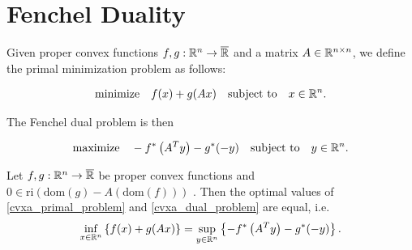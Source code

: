 \section{Fenchel Duality}


Given 
proper convex functions $f, g : \mathbb{R}^n \to \overline{\mathbb{R}}$ 
and
a matrix $A \in \mathbb{R}^{n \times n}$,
we define 
the primal minimization problem as follows:

\begin{gather}
  \label{cvxa_primal_problem}
  \text{minimize}
  \quad
  f(x) + g(Ax) 
  \quad
  \text{subject to}
  \quad
  x \in \mathbb{R}^n.
\end{gather}

The Fenchel dual problem is then

\begin{gather}
  \label{cvxa_dual_problem}
  \text{maximize}
  \quad
  -f^* \left( A^T y \right) - g^*(-y) 
  \quad
  \text{subject to}
  \quad
  y \in \mathbb{R}^n.
\end{gather}

\begin{theorem}
  \label{cvxa_fenchel_theorem}
  Let 
  $f, g : \mathbb{R}^n \to \overline{\mathbb{R}}$ 
  be proper convex functions
  and
  $0 \in \text{ri}(\text{dom}(g) - A (\text{dom}(f)) )$
  .
  Then the optimal values of \eqref{cvxa_primal_problem} and \eqref{cvxa_dual_problem} are equal, 
  i.e.
  \begin{gather}
    \inf_{x \in \mathbb{R}^n} 
    \left\{ f(x) + g(Ax) \right\}
    =
    \sup_{y \in \mathbb{R}^n} \left\{   -f^* \left( A^T y \right) - g^*(-y) \right\}
    .
  \end{gather}
\end{theorem}
